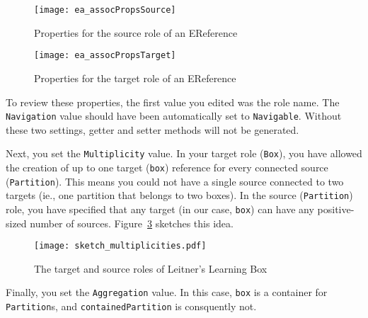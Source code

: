 \begin{itemize}
\vspace{0.5cm}

\begin{figure}[htbp]
	\centering
    \texttt{[image: ea\_assocPropsSource]}
	\caption{Properties for the source role of an EReference}
	\label{fig:role_source}
\end{figure}

\begin{figure}[htbp]
	\centering
	  \texttt{[image: ea\_assocPropsTarget]}
	\caption{Properties for the target role of an EReference}
	\label{fig:role_target}
\end{figure}

\end{itemize}

To review these properties, the first value you edited was the role name. The \texttt{Navigation} value should have been automatically set to
\texttt{Na\-vi\-ga\-ble}. Without these two settings, getter and setter methods will not be generated.

Next, you set the \texttt{Multiplicity} value. In your target role (\texttt{Box}), you have allowed the creation of up to one target (\texttt{box}) reference
for every connected source (\texttt{Partition}). This means you could not have a single source connected to two targets (ie., one partition that belongs to two
boxes). In the source (\texttt{Partition}) role, you have specified that any target (in our case, \texttt{box}) can have any positive-sized number of sources.
Figure~\ref{fig:sketch_roles} sketches this idea.

\vspace{0.5cm}

\begin{figure}[htbp]
	\centering
    \texttt{[image: sketch\_multiplicities.pdf]}
	\caption{The target and source roles of Leitner's Learning Box}
	\label{fig:sketch_roles}
\end{figure}
\FloatBarrier

Finally, you set the \texttt{Aggregation} value. In this case, \texttt{box} is a container for \texttt{Partition}s, and \texttt{containedPartition} is
consquently not.

